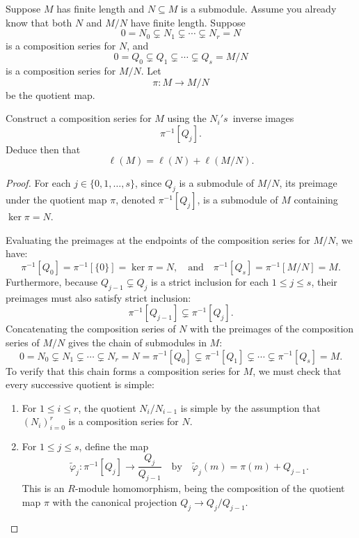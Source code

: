 \documentclass[11pt]{article}
\begin{document}
\begin{prob}
    Suppose $M$ has finite length and $N \subseteq M$ is a 
    submodule. Assume you already know that both $N$ and 
    $M/N$ have finite length. 
    Suppose 
    \[
        0 = N_0 \subsetneq N_1 \subsetneq \cdots \subsetneq N_r = N
    \]
    is a composition series for $N$, and 
    \[
        0 = Q_0 \subsetneq Q_1 \subsetneq \cdots \subsetneq Q_s = M/N
    \]
    is a composition series for $M/N$. 
    Let 
    \[
        \pi : M \to M/N
    \]
    be the quotient map. 

    Construct a composition series for $M$ using the $N_i's$ inverse 
    images 
    \[
        \pi^{-1}[Q_j]. 
    \]
    Deduce then that 
    \[
        \ell(M) = \ell(N) + \ell(M/N).
    \]
\end{prob}
\begin{proof}
    For each $j \in \{0, 1, \dots, s\}$, since $Q_j$ is a submodule of $M/N$, its preimage under the quotient map $\pi$, denoted $\pi^{-1}[Q_j]$, is a submodule of $M$ containing $\ker \pi = N$. 

    Evaluating the preimages at the endpoints of the composition series for $M/N$, we have:
    \[
        \pi^{-1}[Q_0] = \pi^{-1}[\{0\}] = \ker \pi = N, \quad \text{and} \quad \pi^{-1}[Q_s] = \pi^{-1}[M/N] = M.
    \]
    Furthermore, because $Q_{j-1} \subsetneq Q_j$ is a strict inclusion for each $1 \le j \le s$, their preimages must also satisfy strict inclusion:
    \[
        \pi^{-1}[Q_{j-1}] \subsetneq \pi^{-1}[Q_j].
    \]
    Concatenating the composition series of $N$ with the preimages of the composition series of $M/N$ gives the chain of submodules in $M$:
    \[
        0 = N_0 \subsetneq N_1 \subsetneq \cdots \subsetneq N_r = N = \pi^{-1}[Q_0] \subsetneq \pi^{-1}[Q_1] \subsetneq \cdots \subsetneq \pi^{-1}[Q_s] = M.
    \]
    To verify that this chain forms a composition series for $M$, we must check that every successive quotient is simple:
    \begin{enumerate}
        \item For $1 \le i \le r$, the quotient $N_i / N_{i-1}$ is simple by the assumption that $(N_i)_{i=0}^r$ is a composition series for $N$.
        \item For $1 \le j \le s$, define the map
        \[
            \tilde{\varphi}_j : \pi^{-1}[Q_j] \longrightarrow \frac{Q_j}{Q_{j-1}} \quad \text{by} \quad \tilde{\varphi}_j(m) = \pi(m) + Q_{j-1}.
        \]
        This is an $R$-module homomorphism, being the composition of the quotient map $\pi$ with the canonical projection $Q_j \to Q_j / Q_{j-1}$.
        

\end{enumerate}
\end{proof}
\end{document}
